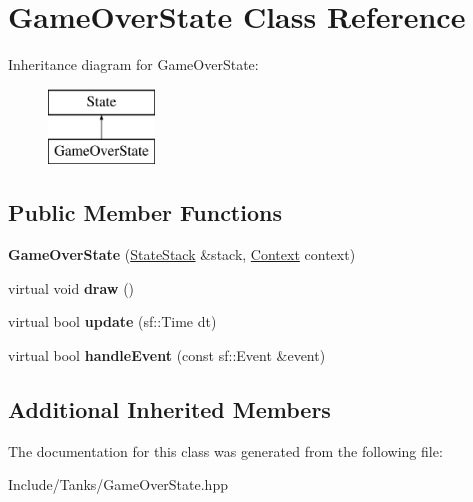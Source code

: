 \hypertarget{class_game_over_state}{}\section{Game\+Over\+State Class Reference}
\label{class_game_over_state}
Inheritance diagram for Game\+Over\+State\+:\begin{figure}[H]
\begin{center}
\leavevmode
\includegraphics[height=2.000000cm]{class_game_over_state}
\end{center}
\end{figure}
\subsection*{Public Member Functions}
\begin{DoxyCompactItemize}
\item 
\hypertarget{class_game_over_state_a45b48ddc81da6e2afa0ef647fd83a123}{}{\bfseries Game\+Over\+State} (\hyperlink{class_state_stack}{State\+Stack} \&stack, \hyperlink{struct_state_1_1_context}{Context} context)\label{class_game_over_state_a45b48ddc81da6e2afa0ef647fd83a123}

\item 
\hypertarget{class_game_over_state_ae2d0593d5344c719bf33fcbb31feee9e}{}virtual void {\bfseries draw} ()\label{class_game_over_state_ae2d0593d5344c719bf33fcbb31feee9e}

\item 
\hypertarget{class_game_over_state_a83adaa9e20dee01b9ca855542532e0cf}{}virtual bool {\bfseries update} (sf\+::\+Time dt)\label{class_game_over_state_a83adaa9e20dee01b9ca855542532e0cf}

\item 
\hypertarget{class_game_over_state_a55ff5cbeb9960405bd9e433fd1f897b8}{}virtual bool {\bfseries handle\+Event} (const sf\+::\+Event \&event)\label{class_game_over_state_a55ff5cbeb9960405bd9e433fd1f897b8}

\end{DoxyCompactItemize}
\subsection*{Additional Inherited Members}


The documentation for this class was generated from the following file\+:\begin{DoxyCompactItemize}
\item 
Include/\+Tanks/Game\+Over\+State.\+hpp\end{DoxyCompactItemize}
